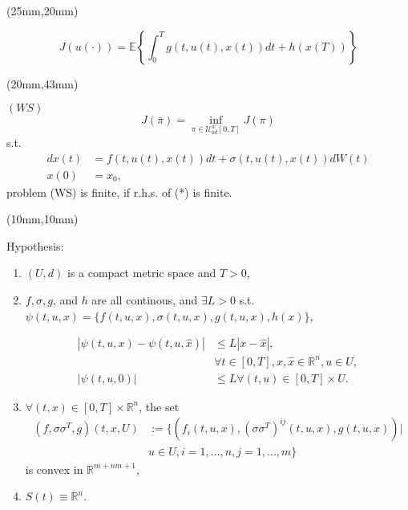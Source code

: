 \begin{frame}[plain]
		\begin{textblock*}{80mm}(25mm,20mm)
		\begin{yellowbox}{}
			\begin{equation*}
				J(u(\cdot))= \mathbb{E}\left\{\int_{0}^{T}g(t,u(t),x(t))dt+h(x(T))\right\}
			\end{equation*}
		\end{yellowbox}
	\end{textblock*}
	
	
	\begin{textblock*}{90mm}(20mm,43mm)
		\begin{graybox}{$(WS)$}
				\begin{equation*}
					J(\bar{\pi})=\inf_{\pi\in \mathcal{U}^w_{ad}[0,T]} J(\pi)
					\tag{*}
				\end{equation*}
				s.t.
				\begin{align*}
					dx(t)&=
					f(t,u(t),x(t))dt+\sigma(t,u(t),x(t))dW(t)\\
					x(0)&=
					x_0,
				\end{align*}
				\tcblower
					problem (WS) is finite, if r.h.s. of (*) is finite. 
			\end{graybox}
	\end{textblock*}
\end{frame}
\begin{frame}[plain]
	\begin{textblock*}{110mm}(10mm,10mm)
		\begin{graybox}{Hypothesis:}
			\begin{enumerate}[(\textbf{{SE}}-1)]
				\item<1->
					$(U,d)$ is a compact metric space and $T>0$,
				\item<2->
					$f,\sigma,g$, and $h$ are all continous, and $\exists L>0$ s.t. $\psi(t,u,x)=\{f(t,u,x),\sigma(t,u,x),g(t,u,x),h(x)\}$, 
					
					\begin{align*}
						|\psi(t,u,x)-\psi(t,u,\hat{x})|&\leq L|x-\hat{x}|,\\
						&\forall t\in [0,T], x,\hat{x}\in \mathbb{R}^n,u\in U,\\
						|\psi(t,u,0)|&\leq L \forall (t,u)\in[0,T]\times U.
					\end{align*}  
				\item<3->
					$\forall (t,x)\in [0,T]\times \mathbb{R}^n$, the set
					\begin{align*}
						(f,\sigma\sigma^T,g)(t,x,U)&:=\{(f_i(t,u,x),(\sigma\sigma^T)^{ij}(t,u,x),g(t,u,x))|\\
						&u\in U,i=1,\ldots,n,j=1,\ldots,m\}
					\end{align*}
					is convex in $\mathbb{R}^{m+nm+1}$,
				\item<4->
					$S(t)\equiv\mathbb{R}^n$.
			\end{enumerate}	
		\end{graybox}
	\end{textblock*}
\end{frame}
